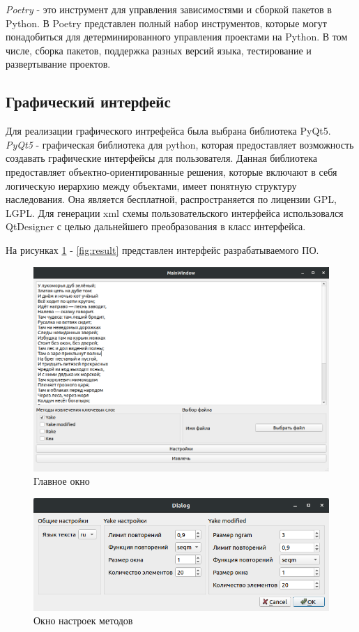 \textit{Poetry} - это инструмент для управления зависимостями и сборкой пакетов в Python.
В Poetry представлен полный набор инструментов, которые могут понадобиться для детерминированного управления проектами на Python. В том числе, сборка пакетов, поддержка разных версий языка, тестирование и развертывание проектов.

\subsection{Графический интерфейс}
Для реализации графического интрефейса была выбрана библиотека PyQt5.
\textit{PyQt5} - графическая библиотека для python, которая предоставляет возможность создавать графические интерфейсы для пользователя. 
Данная библиотека предоставляет объектно-ориентированные решения, которые включают в себя логическую иерархию между объектами, имеет понятную структуру наследования.
Она является бесплатной, распространяется по лицензии GPL, LGPL.
Для генерации xml схемы пользовательского интерфейса использовался QtDesigner с целью дальнейшего преобразования в класс интерфейса.

На рисунках \ref{fig:1} - \ref{fig:result} представлен интерфейс разрабатываемого ПО.

\begin{figure}[!h]
	\centering
	\includegraphics[width=1\linewidth]{src/img/programm/1}
	\caption{Главное окно}
	\label{fig:1}
\end{figure}

\begin{figure}[!h]
	\centering
	\includegraphics[width=1\linewidth]{src/img/programm/settings}
	\caption{Окно настроек методов}
	\label{fig:settings}
\end{figure}

